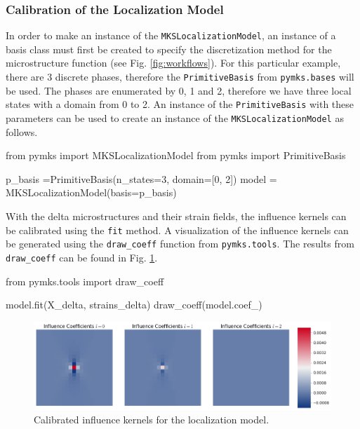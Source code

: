 \documentclass{bmcart}
\newcommand{\fimage}
{\fcolorbox{outcolor}{white}}
{}
\begin{document}

    \subsubsection{Calibration of the Localization
Model}\label{calibration-of-the-localization-model}

    In order to make an instance of the \texttt{MKSLocalizationModel},
an instance of a basis class must first be created to specify the
discretization method for the microstructure function (see Fig.
\ref{fig:workflows}). For this particular example, there are 3 discrete
phases, therefore the \texttt{PrimitiveBasis} from \texttt{pymks.bases}
will be used. The phases are enumerated by 0, 1 and 2, therefore
we have three local states with a domain from 0 to 2. An instance of the
\texttt{PrimitiveBasis} with these parameters can be used to create an
instance of the \texttt{MKSLocalizationModel} as follows.

\begin{_input}
from pymks import MKSLocalizationModel
from pymks import PrimitiveBasis

p_basis =PrimitiveBasis(n_states=3, domain=[0, 2])
model = MKSLocalizationModel(basis=p_basis)
\end{_input}

    With the delta microstructures and their strain fields, the influence
kernels can be calibrated using the \texttt{fit} method.
A visualization of the influence kernels can be generated using the
\texttt{draw\_coeff} function from \texttt{pymks.tools}. The results
from \texttt{draw\_coeff} can be found in Fig. \ref{fig:drawCoeff}.

\begin{_input}
from pymks.tools import draw_coeff

model.fit(X_delta, strains_delta)
draw_coeff(model.coef_)
\end{_input}



\begin{figure}
    \centering
    \includegraphics[scale=.37]{pymks_paper_localization_files/pymks_paper_localization_10_0.png}
    \caption{Calibrated influence kernels for the localization model.}
    \label{fig:drawCoeff}
\end{figure}
\end{document}
